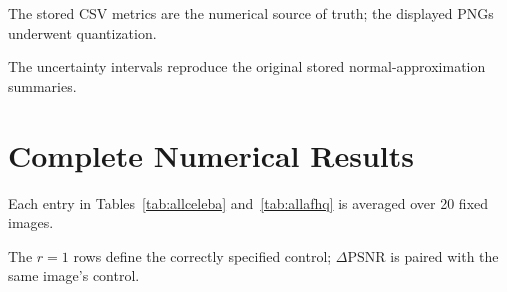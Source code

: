 \documentclass[11pt,a4paper]{article}
\begin{document}
The stored CSV metrics are the numerical source of truth;
the displayed PNGs underwent quantization.

The uncertainty intervals reproduce the original stored
normal-approximation summaries.



\section{Complete Numerical Results}

Each entry in Tables~\ref{tab:allceleba} and~\ref{tab:allafhq}
is averaged over 20 fixed images.

The $r=1$ rows define the correctly specified control;
$\Delta\mathrm{PSNR}$ is paired with the same image's control.


\end{document}
